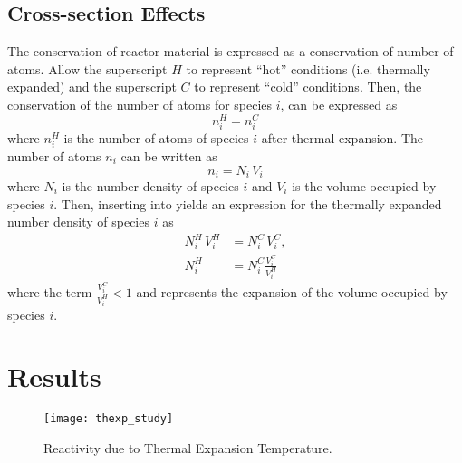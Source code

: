   \subsection{Cross-section Effects}
    The conservation of reactor material is expressed as a conservation of 
    number of atoms. Allow the superscript $H$ to represent ``hot'' conditions 
    (i.e.  thermally expanded) and the superscript $C$ to represent ``cold'' 
    conditions.  Then, the conservation of the number of atoms for species $i$, 
    can be expressed as
    \begin{equation}
      \label{eq:conservation}
      n_i^H = n_i^C 
    \end{equation}
    where $n_i^H$ is the number of atoms of species $i$ after thermal expansion.
    The number of atoms $n_i$ can be written as 
    \begin{equation}
      \label{eq:nden_definition}
      n_i = N_i \, V_i
    \end{equation}
    where $N_i$ is the number density of species $i$ and $V_i$ is the volume
    occupied by species $i$. Then, inserting  into 
     yields an expression for the thermally expanded 
    number density of species $i$ as
    \begin{align}
      N_i^H \, V_i^H &= N_i^C \, V_i^C, \\
      N_i^H &= N_i^C \frac{V_i^C}{V_i^H}
    \end{align}
    where the term $\frac{V_i^C}{V_i^H} < 1$ and represents the expansion of the
    volume occupied by species $i$.

\section{Results}
  \begin{figure}
    \centering
    \texttt{[image: thexp\_study]}
    \caption{Reactivity due to Thermal Expansion Temperature.}
    \label{fig:thexp_study}
  \end{figure}

